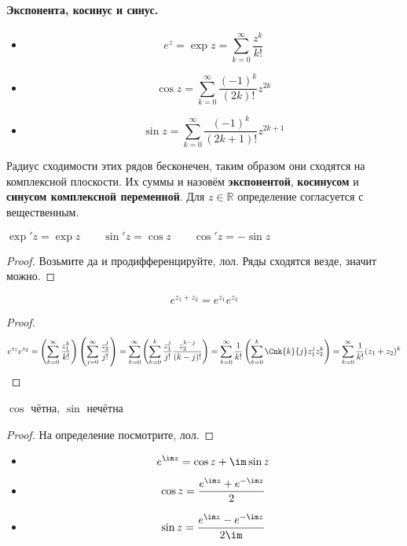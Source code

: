 \documentclass{article}
\begin{document}
    \paragraph{Экспонента, косинус и синус.}
    \begin{definition}
        \begin{itemize}
            \item $$
            e^z=\exp z=\sum\limits_{k=0}^\infty\frac{z^k}{k!}
            $$
            \item $$
            \cos z=\sum\limits_{k=0}^\infty\frac{(-1)^k}{(2k)!}z^{2k}
            $$
            \item $$
            \sin z=\sum\limits_{k=0}^\infty\frac{(-1)^k}{(2k+1)!}z^{2k+1}
            $$
        \end{itemize}
        Радиус сходимости этих рядов бесконечен, таким образом они сходятся на комплексной плоскости. Их суммы и назовём \textbf{экспонентой}, \textbf{косинусом} и \textbf{синусом комплексной переменной}. Для $z\in\mathbb R$ определение согласуется с вещественным.
    \end{definition}
    \begin{property}
        $\exp'z=\exp z\qquad\sin'z=\cos z\qquad\cos'z=-\sin z$
    \end{property}
    \begin{proof}
        Возьмите да и продифференцируйте, лол. Ряды сходятся везде, значит можно.
    \end{proof}
    \begin{property}
        $$
        e^{z_1+z_2}=e^{z_1}e^{z_2}
        $$
    \end{property}
    \begin{proof}
        $$
        e^{z_1}e^{z_2}=\left(\sum\limits_{k=0}^\infty\frac{z_1^k}{k!}\right)\left(\sum\limits_{j=0}^\infty\frac{z_2^j}{j!}\right)=\sum\limits_{k=0}^\infty\left(\sum\limits_{k=0}^k\frac{z_1^j}{j!}\frac{z_2^{k-j}}{(k-j)!}\right)=\sum\limits_{k=0}^\infty\frac1{k!}\left(\sum\limits_{k=0}^k\Cnk{k}{j}z_1^jz_2^k\right)=\sum\limits_{k=0}^\infty\frac1{k!}(z_1+z_2)^k
        $$
    \end{proof}
    \begin{property}
        $\cos$ чётна, $\sin$ нечётна
    \end{property}
    \begin{proof}
        На определение посмотрите, лол.
    \end{proof}
    \begin{property}
        \begin{itemize}
            \item $$
            e^{\im z}=\cos z+\im\sin z
            $$
            \item $$
            \cos z=\frac{e^{\im z}+e^{-\im z}}2
            $$
            \item $$
            \sin z=\frac{e^{\im z}-e^{-\im z}}{2\im}
            $$
        \end{itemize}
    \end{property}
\end{document}
